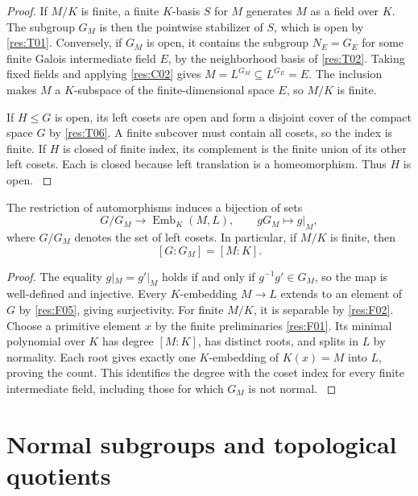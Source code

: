 \begin{proof}
If \(M/K\) is finite, a finite \(K\)-basis \(S\) for \(M\) generates
\(M\) as a field over \(K\). The subgroup \(G_M\) is then the
pointwise stabilizer of \(S\), which is open by \ref{res:T01}.
Conversely, if \(G_M\) is open, it contains the subgroup \(N_E=G_E\)
for some finite Galois intermediate field \(E\), by the neighborhood
basis of \ref{res:T02}. Taking fixed fields and applying \ref{res:C02}
gives \(M=L^{G_M}\subseteq L^{G_E}=E\). The inclusion makes \(M\)
a \(K\)-subspace of the finite-dimensional space \(E\), so \(M/K\)
is finite.

If \(H\leq G\) is open, its left cosets are open and form a disjoint
cover of the compact space \(G\) by \ref{res:T06}. A finite subcover
must contain all cosets, so the index is finite. If \(H\) is closed
of finite index, its complement is the finite union of its other
left cosets. Each is closed because left translation is a
homeomorphism. Thus \(H\) is open.
\cite[Theorem 7.13(b)]{milne}
\cite[Sections 2.1 and 2.11]{rz}
\end{proof}

\begin{proposition}
\label{res:C07}
The restriction of automorphisms induces a bijection of sets
\[
  G/G_M \longrightarrow \operatorname{Emb}_K(M,L),
  \qquad gG_M\longmapsto g|_M ,
\]
where \(G/G_M\) denotes the set of left cosets. In particular, if
\(M/K\) is finite, then
\[
    [G:G_M]=[M:K].
\]
\end{proposition}

\begin{proof}
The equality \(g|_M=g'|_M\) holds if and only if
\(g^{-1}g'\in G_M\), so the map is well-defined and injective.
Every \(K\)-embedding \(M\to L\) extends to an element of \(G\)
by \ref{res:F05}, giving surjectivity. For finite \(M/K\), it is
separable by \ref{res:F02}. Choose a primitive element \(x\) by
the finite preliminaries \ref{res:F01}. Its minimal polynomial
over \(K\) has degree \([M:K]\), has distinct roots, and splits
in \(L\) by normality. Each root gives exactly one \(K\)-embedding
of \(K(x)=M\) into \(L\), proving the count. This identifies the
degree with the coset index for every finite intermediate field,
including those for which \(G_M\) is not normal.
\cite[Proposition 7.4 and Theorem 7.13(b)]{milne}
\cite[Chapters 12 and 14]{d07}
\end{proof}

\section{Normal subgroups and topological quotients}
\label{sec:normal-quotients}

